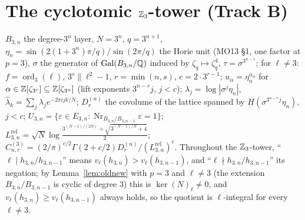 \chapter{The cyclotomic $\mathbb{Z}_3$-tower (Track B)}
\begin{definition}[The $p=3$ data]\label{def:p3}
$B_{3,n}$ the degree-$3^n$ layer, $N=3^n$, $q=3^{n+1}$, $\eta_n=\sin(2(1+3^n)\pi/q)/\sin(2\pi/q)$ the Horie unit (MO13 \S1, one factor at $p=3$), $\sigma$ the generator of $\operatorname{Gal}(B_{3,n}/\mathbb{Q})$ induced by $\zeta_q\mapsto\zeta_q^4$, $\tau=\sigma^{3^{n-1}}$; for $\ell\ne3$: $f=\operatorname{ord}_3(\ell)$, $3^s\|\ell^2-1$, $r=\min(n,s)$, $c=2\cdot3^{r-1}$; $u_\alpha=\eta_n^{\alpha_\sigma}$ for $\alpha\in\mathbb{Z}[\zeta_{3^r}]\subseteq\mathbb{Z}[\zeta_{3^n}]$ (lift exponents $3^{n-r}j$, $j<c$); $\lambda_j=\log|\sigma^j\eta_n|$, $\hat\lambda_k=\sum_j\lambda_je^{-2\pi ijk/N}$; $D_r^{(n)}$ the covolume of the lattice spanned by $H(\sigma^{3^{n-r}j}\eta_n)$, $j<c$; $U_{3,n}=\{\varepsilon\in E_{3,n}:\operatorname{Nr}_{B_{3,n}/B_{3,n-1}}\varepsilon=1\}$; $L^{\mathrm{rel}}_{3,n}=\sqrt N\log\frac{3^{(N-1)/(2N)}+\sqrt{3^{(N-1)/N}+4}}2$; $C^{(3)}_{n,r}=(2/\pi)^{c/2}\Gamma(2+c/2)D_r^{(n)}/(L^{\mathrm{rel}}_{3,n})^c$. Throughout the $\mathbb{Z}_3$-tower, ``$\ell\mid h_{3,n}/h_{3,n-1}$'' means $v_\ell(h_{3,n})>v_\ell(h_{3,n-1})$, and ``$\ell\nmid h_{3,n}/h_{3,n-1}$'' its negation; by Lemma~\ref{lem:oldnew} with $p=3$ and $\ell\ne3$ (the extension $B_{3,n}/B_{3,n-1}$ is cyclic of degree $3$) this is $\ker(N)_\ell\ne0$, and $v_\ell(h_{3,n})\ge v_\ell(h_{3,n-1})$ always holds, so the quotient is $\ell$-integral for every $\ell\ne3$.
\end{definition}
\begin{lemma}\label{lem:mo25-z3}

\end{lemma}
\par{}\par
\begin{lemma}\label{lem:normone}\leanok

\end{lemma}
\par{}\par
